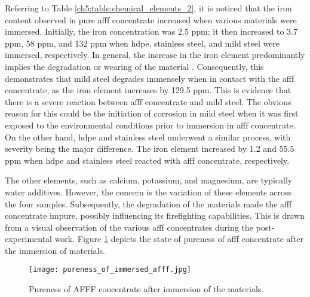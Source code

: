 Referring to Table \ref{ch5:table:chemical_elements_2}, it is noticed that the iron content observed in pure \acrshort{afff} concentrate increased when various materials were immersed. Initially, the iron concentration was 2.5 ppm; it then increased to 3.7 ppm, 58 ppm, and 132 ppm when \acrshort{hdpe}, stainless steel, and mild steel were immersed, respectively. In general, the increase in the iron element predominantly implies the degradation or wearing of the material \cite{mcarthur2004engineering}. Consequently, this demonstrates that mild steel degrades immensely when in contact with the \acrshort{afff} concentrate, as the iron element increases by 129.5 ppm. This is evidence that there is a severe reaction between \acrshort{afff} concentrate and mild steel. The obvious reason for this could be the initiation of corrosion in mild steel when it was first exposed to the environmental conditions prior to immersion in \acrshort{afff} concentrate. On the other hand, \acrshort{hdpe} and stainless steel underwent a similar process, with severity being the major difference. The iron element increased by 1.2 and 55.5 ppm when \acrshort{hdpe} and stainless steel reacted with \acrshort{afff} concentrate, respectively.

The other elements, such as calcium, potassium, and magnesium, are typically water additives. However, the concern is the variation of these elements across the four samples. Subsequently, the degradation of the materials made the \acrshort{afff} concentrate impure, possibly influencing its firefighting capabilities. This is drawn from a visual observation of the various \acrshort{afff} concentrates during the post-experimental work. Figure \ref{ch5:figure:pureness} depicts the state of pureness of \acrshort{afff} concentrate after the immersion of materials.
 
\begin{figure}[H]
    \centering
    \texttt{[image: pureness\_of\_immersed\_afff.jpg]}
    \caption{Pureness of AFFF concentrate after immersion of the materials.}
    \label{ch5:figure:pureness}
\end{figure}

